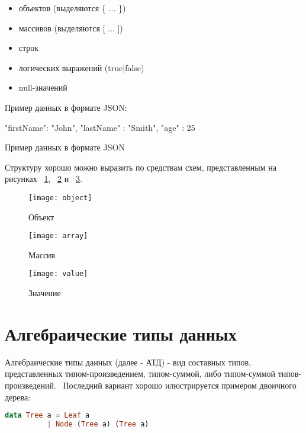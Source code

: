 \begin{itemize}
  \item объектов (выделяются \{ ... \})
  \item массивов (выделяются [ ... ])
  \item строк
  \item логических выражений (true|false)
  \item null-значений
\end{itemize}

\begin{ListingEnv}[H]
Пример данных в формате JSON:
\begin{Verb}
{     
    "firstName": "John",
    "lastName" : "Smith",
    "age" : 25
}
\end{Verb}
\caption{Пример данных в формате JSON}
\label{listing:jsonExample}
\end{ListingEnv}

Структуру хорошо можно выразить по средствам схем, представленным на рисунках ~\ref{fig:objectGr}, ~\ref{fig:arrayGr} и ~\ref{fig:valueGr}.

\begin{figure}[!ht]
\centering
\texttt{[image: object]}
\caption{\label{fig:objectGr}Объект}
\end{figure}

\begin{figure}[!ht]
\centering
\texttt{[image: array]}
\caption{\label{fig:arrayGr}Массив}
\end{figure}

\begin{figure}[!ht]
\centering
\texttt{[image: value]}
\caption{\label{fig:valueGr}Значение}
\end{figure}

\section{Алгебраические типы данных}

Алгебраические типы данных (далее - АТД) - вид составных типов, представленных типом-произведением, типом-суммой, либо типом-суммой типов-произведений.~\cite{haskellGreatGood} Последний вариант хорошо илюстрируется примером двоичного дерева:

\begin{lstlisting}[language=Haskell]
data Tree a = Leaf a
          | Node (Tree a) (Tree a)
\end{lstlisting}

